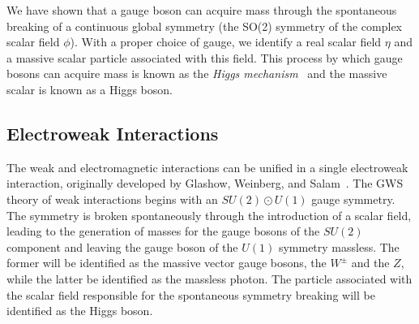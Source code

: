 We have shown that a gauge boson can acquire mass through the spontaneous breaking of a continuous global symmetry (the SO(2) symmetry of the complex scalar field $\phi$).
With a proper choice of gauge, we identify a real scalar field $\eta$ and a massive scalar particle associated with this field.
This process by which gauge bosons can acquire mass is known as the \emph{Higgs mechanism}~\cite{Higgs:1964pj,Englert:1964et} and the massive scalar is known as a Higgs boson.

\subsection{Electroweak Interactions} \label{sec:theory_ewk}
The weak and electromagnetic interactions can be unified in a single electroweak interaction, originally developed by Glashow, Weinberg, and Salam~\cite{Glashow:1959wxa,Weinberg:1967tq,Salam:1968rm}.
The GWS theory of weak interactions begins with an $SU(2) \odot U(1)$ gauge symmetry.
The symmetry is broken spontaneously through the introduction of a scalar field, leading to the generation of masses for the gauge bosons of the $SU(2)$ component and leaving the gauge boson of the $U(1)$ symmetry massless.
The former will be identified as the massive vector gauge bosons, the $W^\pm$ and the $Z$, while the latter be identified as the massless photon.
The particle associated with the scalar field responsible for the spontaneous symmetry breaking will be identified as the Higgs boson.

